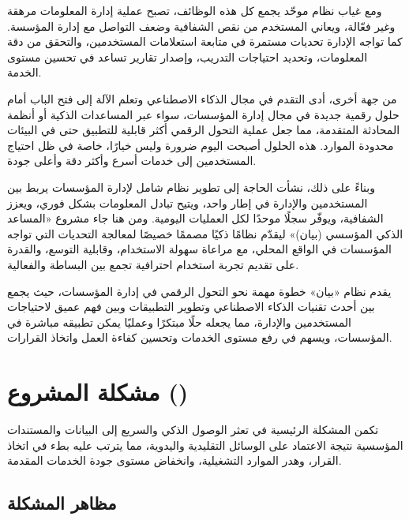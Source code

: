 ومع غياب نظام موحّد يجمع كل هذه الوظائف، تصبح عملية إدارة المعلومات مرهقة
وغير فعّالة، ويعاني المستخدم من نقص الشفافية وضعف التواصل مع إدارة المؤسسة.
كما تواجه الإدارة تحديات مستمرة في متابعة استعلامات المستخدمين، والتحقق من
دقة المعلومات، وتحديد احتياجات التدريب، وإصدار تقارير تساعد في تحسين مستوى
الخدمة.

من جهة أخرى، أدى التقدم في مجال الذكاء الاصطناعي وتعلم الآلة إلى فتح الباب
أمام حلول رقمية جديدة في مجال إدارة المؤسسات، سواء عبر المساعدات الذكية أو
أنظمة المحادثة المتقدمة، مما جعل عملية التحول الرقمي أكثر قابلية للتطبيق حتى
في البيئات محدودة الموارد. هذه الحلول أصبحت اليوم ضرورة وليس خيارًا، خاصة في
ظل احتياج المستخدمين إلى خدمات أسرع وأكثر دقة وأعلى جودة.

وبناءً على ذلك، نشأت الحاجة إلى تطوير نظام شامل لإدارة المؤسسات يربط بين
المستخدمين والإدارة في إطار واحد، ويتيح تبادل المعلومات بشكل فوري، ويعزز
الشفافية، ويوفّر سجلًا موحدًا لكل العمليات اليومية. ومن هنا جاء مشروع
«المساعد الذكي المؤسسي (بيان)» ليقدّم نظامًا ذكيًا مصممًا خصيصًا لمعالجة
التحديات التي تواجه المؤسسات في الواقع المحلي، مع مراعاة سهولة الاستخدام،
وقابلية التوسع، والقدرة على تقديم تجربة استخدام احترافية تجمع بين البساطة
والفعالية.

يقدم نظام «بيان» خطوة مهمة نحو التحول الرقمي في إدارة المؤسسات، حيث يجمع
بين أحدث تقنيات الذكاء الاصطناعي وتطوير التطبيقات وبين فهم عميق لاحتياجات
المستخدمين والإدارة، مما يجعله حلًا مبتكرًا وعمليًا يمكن تطبيقه مباشرة في
المؤسسات، ويسهم في رفع مستوى الخدمات وتحسين كفاءة العمل واتخاذ القرارات.

\section{مشكلة المشروع ()}
\label{sec:problem}

تكمن المشكلة الرئيسية في تعثر الوصول الذكي والسريع إلى البيانات والمستندات
المؤسسية نتيجة الاعتماد على الوسائل التقليدية واليدوية، مما يترتب عليه بطء
في اتخاذ القرار، وهدر الموارد التشغيلية، وانخفاض مستوى جودة الخدمات المقدمة.

\subsection*{مظاهر المشكلة}

